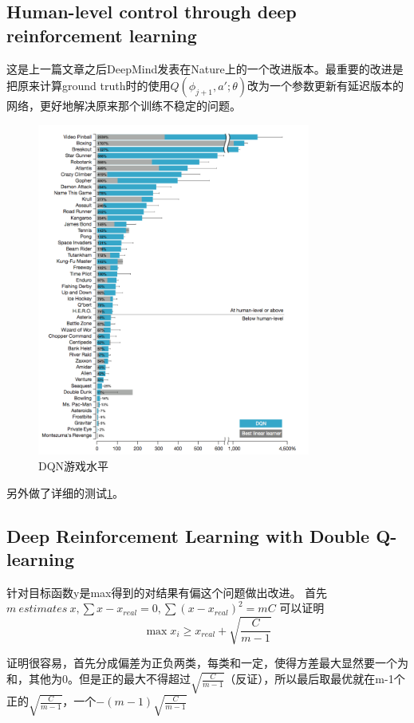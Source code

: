 \documentclass[a4paper]{article}
\begin{document}
\subsection{Human-level control through deep reinforcement learning\cite{Mnih2015Human}}
这是上一篇文章之后DeepMind发表在Nature上的一个改进版本。最重要的改进是把原来计算ground truth时的使用$Q(\phi_{j+1},a';\theta)$改为一个参数更新有延迟版本的网络，更好地解决原来那个训练不稳定的问题。
\begin{figure}
\centering
\includegraphics[width=0.8\textwidth]{./img/27.png}
\caption{DQN游戏水平}
\label{fig:27}
\end{figure}
另外做了详细的测试\ref{fig:27}。
\subsection{Deep Reinforcement Learning with Double Q-learning\cite{DBLP:journals/corr/HasseltGS15}}
针对目标函数y是max得到的对结果有偏这个问题做出改进。
首先$m \ estimates \ x,\sum x - x_{real} = 0, \sum (x-x_{real})^2=mC$
可以证明$$\max x_i \geq x_{real} + \sqrt{\frac{C}{m-1}}$$

证明很容易，首先分成偏差为正负两类，每类和一定，使得方差最大显然要一个为和，其他为0。但是正的最大不得超过$\sqrt{\frac{C}{m-1}}$（反证），所以最后取最优就在m-1个正的$\sqrt{\frac{C}{m-1}}$$，一个$$-(m-1)\sqrt{\frac{C}{m-1}}$
\end{document}
